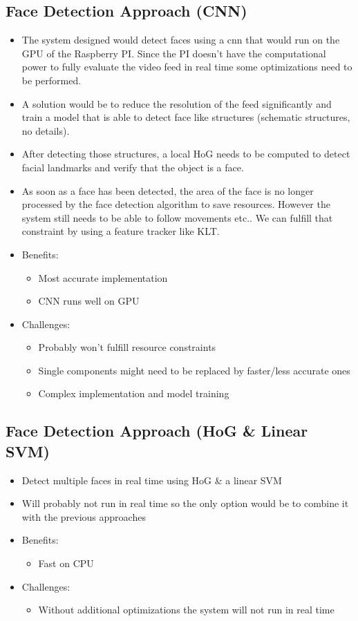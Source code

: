 \subsection{Face Detection Approach (CNN)}
\begin{itemize}
    \item The system designed would detect faces using a \gls{cnn} that would run on the GPU of the Raspberry PI. Since the PI doesn’t have the computational power to fully evaluate the video feed in real time some optimizations need to be performed. 
    \item A solution would be to reduce the resolution of the feed significantly and train a model that is able to detect face like structures (schematic structures, no details). 
    \item After detecting those structures, a local HoG needs to be computed to detect facial landmarks and verify that the object is a face. 
    \item As soon as a face has been detected, the area of the face is no longer processed by the face detection algorithm to save resources. However the system still needs to be able to follow movements etc.. We can fulfill that constraint by using a feature tracker like KLT.
    \item Benefits:
            \begin{itemize}
        \item Most accurate implementation
        \item CNN runs well on GPU
                \end{itemize}
    \item Challenges:
            \begin{itemize}
        \item Probably won’t fulfill resource constraints
        \item Single components might need to be replaced by faster/less accurate ones
        \item Complex implementation and model training
                \end{itemize}
\end{itemize}
\subsection{Face Detection Approach (HoG \& Linear SVM)}
\begin{itemize}
    \item Detect multiple faces in real time using HoG \& a linear SVM
    \item Will probably not run in real time so the only option would be to combine it with the previous approaches 
    \item Benefits:
            \begin{itemize}
        \item Fast on CPU
                \end{itemize}
    \item Challenges:
            \begin{itemize}
        \item Without additional optimizations the system will not run in real time
                \end{itemize}
\end{itemize}
